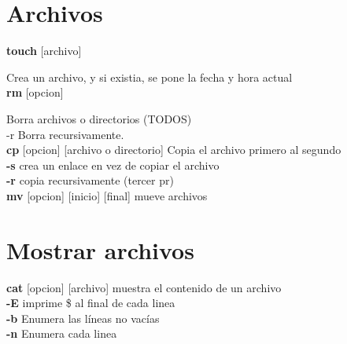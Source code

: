 \documentclass[11pt]{article}
\begin{document}
\section{Archivos}
\textbf{touch} [archivo] 

\hspace{2cm} Crea un archivo, y si existia, se pone la fecha y hora actual
\\

\textbf{rm} [opcion] 

\hspace{2cm} Borra archivos o directorios (TODOS)\\

\hspace{2cm} -r 
\hspace{2cm}Borra recursivamente.\\

\textbf{cp} [opcion] [archivo o directorio] \hspace{2cm} Copia el archivo primero al segundo\\

\hspace{2cm}\textbf{-s} crea un enlace en vez de copiar el archivo\\

\hspace{2cm} \textbf{-r} copia recursivamente (tercer pr)\\

\textbf{mv} [opcion] [inicio] [final] \hspace{2cm} mueve archivos \\

\section{Mostrar archivos}

\textbf{cat} [opcion] [archivo] \hspace{2cm} muestra el contenido de un archivo\\

\hspace{2cm} \textbf{-E} \hspace{2cm} imprime \$ al final de cada linea\\

\hspace{2cm} \textbf{-b} \hspace{2cm} Enumera las líneas no vacías\\

\hspace{2cm} \textbf{-n} \hspace{2cm} Enumera cada linea\\
\end{document}
